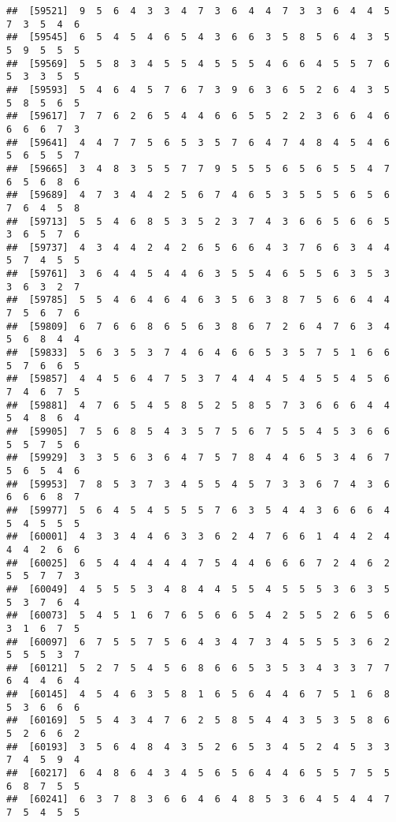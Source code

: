 \documentclass[
]{book}
\begin{document}
\begin{verbatim}
##  [59521]  9  5  6  4  3  3  4  7  3  6  4  4  7  3  3  6  4  4  5  7  3  5  4  6
##  [59545]  6  5  4  5  4  6  5  4  3  6  6  3  5  8  5  6  4  3  5  5  9  5  5  5
##  [59569]  5  5  8  3  4  5  5  4  5  5  5  4  6  6  4  5  5  7  6  5  3  3  5  5
##  [59593]  5  4  6  4  5  7  6  7  3  9  6  3  6  5  2  6  4  3  5  5  8  5  6  5
##  [59617]  7  7  6  2  6  5  4  4  6  6  5  5  2  2  3  6  6  4  6  6  6  6  7  3
##  [59641]  4  4  7  7  5  6  5  3  5  7  6  4  7  4  8  4  5  4  6  5  6  5  5  7
##  [59665]  3  4  8  3  5  5  7  7  9  5  5  5  6  5  6  5  5  4  7  6  5  6  8  6
##  [59689]  4  7  3  4  4  2  5  6  7  4  6  5  3  5  5  5  6  5  6  7  6  4  5  8
##  [59713]  5  5  4  6  8  5  3  5  2  3  7  4  3  6  6  5  6  6  5  3  6  5  7  6
##  [59737]  4  3  4  4  2  4  2  6  5  6  6  4  3  7  6  6  3  4  4  5  7  4  5  5
##  [59761]  3  6  4  4  5  4  4  6  3  5  5  4  6  5  5  6  3  5  3  3  6  3  2  7
##  [59785]  5  5  4  6  4  6  4  6  3  5  6  3  8  7  5  6  6  4  4  7  5  6  7  6
##  [59809]  6  7  6  6  8  6  5  6  3  8  6  7  2  6  4  7  6  3  4  5  6  8  4  4
##  [59833]  5  6  3  5  3  7  4  6  4  6  6  5  3  5  7  5  1  6  6  5  7  6  6  5
##  [59857]  4  4  5  6  4  7  5  3  7  4  4  4  5  4  5  5  4  5  6  7  4  6  7  5
##  [59881]  4  7  6  5  4  5  8  5  2  5  8  5  7  3  6  6  6  4  4  5  4  8  6  4
##  [59905]  7  5  6  8  5  4  3  5  7  5  6  7  5  5  4  5  3  6  6  5  5  7  5  6
##  [59929]  3  3  5  6  3  6  4  7  5  7  8  4  4  6  5  3  4  6  7  5  6  5  4  6
##  [59953]  7  8  5  3  7  3  4  5  5  4  5  7  3  3  6  7  4  3  6  6  6  6  8  7
##  [59977]  5  6  4  5  4  5  5  5  7  6  3  5  4  4  3  6  6  6  4  5  4  5  5  5
##  [60001]  4  3  3  4  4  6  3  3  6  2  4  7  6  6  1  4  4  2  4  4  4  2  6  6
##  [60025]  6  5  4  4  4  4  4  7  5  4  4  6  6  6  7  2  4  6  2  5  5  7  7  3
##  [60049]  4  5  5  5  3  4  8  4  4  5  5  4  5  5  5  3  6  3  5  5  3  7  6  4
##  [60073]  5  4  5  1  6  7  6  5  6  6  5  4  2  5  5  2  6  5  6  3  1  6  7  5
##  [60097]  6  7  5  5  7  5  6  4  3  4  7  3  4  5  5  5  3  6  2  5  5  5  3  7
##  [60121]  5  2  7  5  4  5  6  8  6  6  5  3  5  3  4  3  3  7  7  6  4  4  6  4
##  [60145]  4  5  4  6  3  5  8  1  6  5  6  4  4  6  7  5  1  6  8  5  3  6  6  6
##  [60169]  5  5  4  3  4  7  6  2  5  8  5  4  4  3  5  3  5  8  6  5  2  6  6  2
##  [60193]  3  5  6  4  8  4  3  5  2  6  5  3  4  5  2  4  5  3  3  7  4  5  9  4
##  [60217]  6  4  8  6  4  3  4  5  6  5  6  4  4  6  5  5  7  5  5  6  8  7  5  5
##  [60241]  6  3  7  8  3  6  6  4  6  4  8  5  3  6  4  5  4  4  7  7  5  4  5  5

\end{verbatim}
\end{document}
